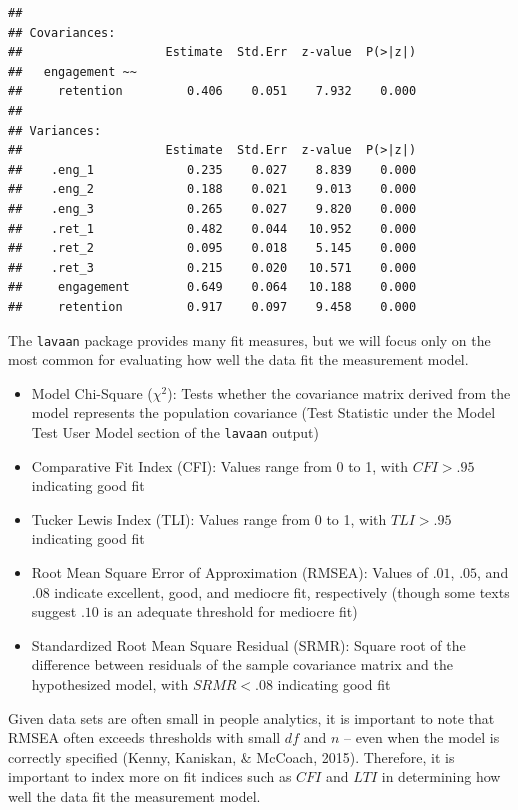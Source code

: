 \documentclass[
]{book}
\providecommand{\tightlist}{%
  \setlength{\itemsep}{0pt}\setlength{\parskip}{0pt}}
\begin{document}
\begin{verbatim}
## 
## Covariances:
##                    Estimate  Std.Err  z-value  P(>|z|)
##   engagement ~~                                       
##     retention         0.406    0.051    7.932    0.000
## 
## Variances:
##                    Estimate  Std.Err  z-value  P(>|z|)
##    .eng_1             0.235    0.027    8.839    0.000
##    .eng_2             0.188    0.021    9.013    0.000
##    .eng_3             0.265    0.027    9.820    0.000
##    .ret_1             0.482    0.044   10.952    0.000
##    .ret_2             0.095    0.018    5.145    0.000
##    .ret_3             0.215    0.020   10.571    0.000
##     engagement        0.649    0.064   10.188    0.000
##     retention         0.917    0.097    9.458    0.000
\end{verbatim}

The \texttt{lavaan} package provides many fit measures, but we will focus only on the most common for evaluating how well the data fit the measurement model.

\begin{itemize}
\tightlist
\item
  Model Chi-Square (\(\chi^2\)): Tests whether the covariance matrix derived from the model represents the population covariance (Test Statistic under the Model Test User Model section of the \texttt{lavaan} output)
\item
  Comparative Fit Index (CFI): Values range from 0 to 1, with \(CFI > .95\) indicating good fit
\item
  Tucker Lewis Index (TLI): Values range from 0 to 1, with \(TLI > .95\) indicating good fit
\item
  Root Mean Square Error of Approximation (RMSEA): Values of \(.01\), \(.05\), and \(.08\) indicate excellent, good, and mediocre fit, respectively (though some texts suggest \(.10\) is an adequate threshold for mediocre fit)
\item
  Standardized Root Mean Square Residual (SRMR): Square root of the difference between residuals of the sample covariance matrix and the hypothesized model, with \(SRMR < .08\) indicating good fit
\end{itemize}

Given data sets are often small in people analytics, it is important to note that RMSEA often exceeds thresholds with small \(df\) and \(n\) -- even when the model is correctly specified (Kenny, Kaniskan, \& McCoach, 2015). Therefore, it is important to index more on fit indices such as \(CFI\) and \(LTI\) in determining how well the data fit the measurement model.
\end{document}
